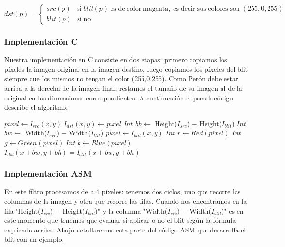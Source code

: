 $dst(p) = \begin{cases}
    src(p) & \mathrm{si \;} blit(p) \mathrm{\; es \; de \; color \; magenta, \; es \; decir \; sus \; colores \; son \;} (255, 0, 255)\\
    blit(p) & \mathrm{si \; no}
\end{cases}$ \\

\subsubsection{Implementación C}

Nuestra implementación en C consiste en dos etapas: primero copiamos los píxeles la imagen original en la imagen destino, luego copiamos los píxeles del blit siempre que los mismos no tengan el color (255,0,255). Como Perón debe estar arriba a la derecha de la imagen final, restamos el tamaño de su imagen al de la original en las dimensiones correspondientes. A continuación el pseudocódigo describe el algoritmo:

\begin{algorithm}[H]
  \begin{algorithmic}[1]
			  \STATE $pixel \gets I_{src}(x,y)$ 
			  \STATE $I_{dst}(x,y) \gets pixel$
			\ENDFOR
		\ENDFOR
		\STATE $Int$ $ bh \gets $ Height($I_{src}$) $-$ Height($I_{blit}$)
		\STATE $Int$ $ bw \gets $ Width($I_{src}$) $-$ Width($I_{blit}$)
			  	\STATE $pixel \gets I_{blit}(x,y)$
				\STATE $Int$ $ r \gets Red(pixel) $
			  	\STATE $Int$ $g \gets Green(pixel)$
			  	\STATE $Int$ $ b \gets Blue(pixel)$
					\STATE $I_{dst}(x+bw,y+bh) = I_{blit}(x+bw,y+bh)$ 
				\ENDIF
			\ENDFOR
		 \ENDFOR
  \end{algorithmic}
  \caption{$blit (I_{src}, I_{dst}, I_{blit})$}
  \label{alg:blit}
\end{algorithm}


\subsubsection{Implementación ASM}

En este filtro procesamos de a 4 píxeles: tenemos dos ciclos, uno que recorre las columnas de la imagen y otra que recorre las filas. Cuando nos encontramos en la fila "Height($I_{src}$) $-$ Height($I_{blit}$)" y la columna "Width($I_{src}$) $-$ Width($I_{blit}$)" es en este momento que tenemos que evaluar si aplicar o no el blit según la fórmula explicada arriba. Abajo detallaremos esta parte del código ASM que desarrolla el blit con un ejemplo.	

